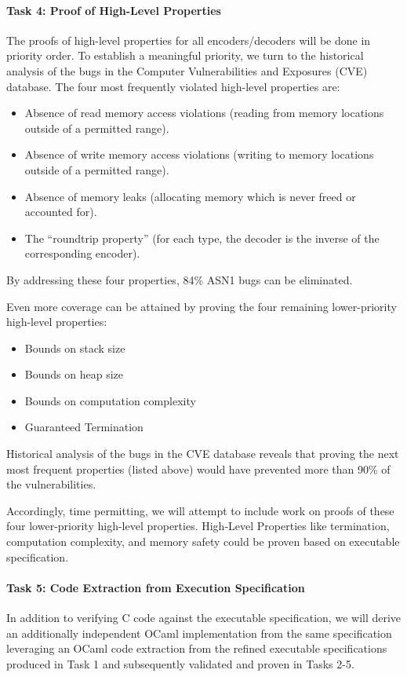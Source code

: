 \documentclass[acmsmall,nonacm]{acmart}
\begin{document}
\paragraph{Task 4: Proof of High-Level Properties} 
The proofs of high-level properties for all encoders/decoders will be done in priority order. To establish a meaningful priority, we turn to the historical analysis of the bugs in the Computer Vulnerabilities and Exposures (CVE) database. The four most frequently violated high-level properties are:
\begin{itemize}

\item Absence of read memory access violations (reading from memory locations outside of a permitted range).
\item Absence of write memory access violations (writing to memory locations outside of a permitted range).
\item Absence of memory leaks (allocating memory which is never freed or accounted for).
\item The ``roundtrip property'' (for each type, the decoder is the inverse of the corresponding encoder).
\end{itemize}

By addressing these four properties, 84\% ASN1 bugs can be eliminated.

Even more coverage can be attained by proving the four remaining lower-priority high-level properties:
\begin{itemize}
\item Bounds on stack size
\item Bounds on heap size
\item Bounds on computation complexity
\item Guaranteed Termination
\end{itemize}
Historical analysis of the bugs in the CVE database reveals that proving the next most frequent properties (listed above) would have prevented more than 90\% of the vulnerabilities. 

Accordingly, time permitting, we will attempt to include work on proofs of these four lower-priority high-level properties. High-Level Properties like termination, computation complexity, and memory safety could be proven based on executable specification. 

\paragraph{Task 5: Code Extraction from Execution Specification}
In addition to verifying C code against the executable specification, we will derive an additionally independent OCaml implementation from the same specification leveraging an OCaml code extraction from the refined executable specifications produced in Task 1 and subsequently validated and proven in Tasks 2-5. 
\end{document}
